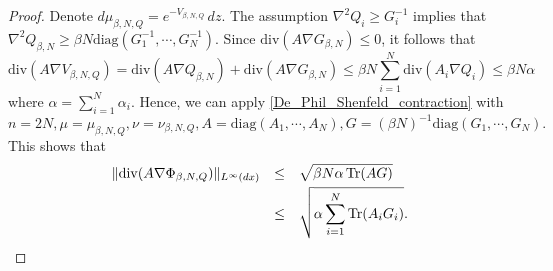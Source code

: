 \documentclass[11pt,a4paper,reqno]{amsart}
\numberwithin{equation}{section}
\theoremstyle{definition}
\newcommand{\nm}{\noalign{\smallskip}}
\newcommand{\ds}{\displaystyle}
\newcommand{\<}{\ensuremath \leq}
\renewcommand{\>}{\ensuremath \geq}
\begin{document}
\begin{proof}
    Denote $d\mu_{\beta,N,Q}=e^{-V_{\beta,N,Q}}\, dz.$ The assumption $\nabla^2 Q_i \geq G_i^{-1}$ implies that $\nabla^2 Q_{\beta,N} \geq \beta N \mathrm{diag}(G_1^{-1},\cdots,G_N^{-1}).$ Since $\mathrm{div}(A\nabla G_{\beta,N}) \leq 0$, it follows that $$\mathrm{div}(A\nabla V_{\beta,N,Q})=\mathrm{div}(A\nabla Q_{\beta,N})+\mathrm{div}(A\nabla G_{\beta,N}) \leq \beta N \sum_{i=1}^N\mathrm{div}(A_i\nabla Q_i) \leq \beta N\alpha$$ where $\alpha=\sum_{i=1}^N \alpha_i.$ Hence, we can apply \cref{De_Phil_Shenfeld_contraction} with $$n=2N, \mu=\mu_{\beta,N,Q}, \nu=\nu_{\beta,N,Q}, A=\mathrm{diag}(A_1,\cdots,A_N), G=(\beta N)^{-1}\mathrm{diag}(G_1,\cdots,G_N).$$ This shows that $$\begin{array}{lll}
    \ds \|\mathrm{div}(A\nabla \Phi_{\beta,N,Q})\|_{L^\infty(dx)} &\leq& \ds \sqrt{\beta N\alpha\, \mathrm{Tr}(AG)} \\
    \nm 
    &\leq& \ds \sqrt{\alpha \sum_{i=1}^N \mathrm{Tr}(A_iG_i)}.
    \end{array}$$
\end{proof}


\bigskip

\printbibliography
\end{document}

